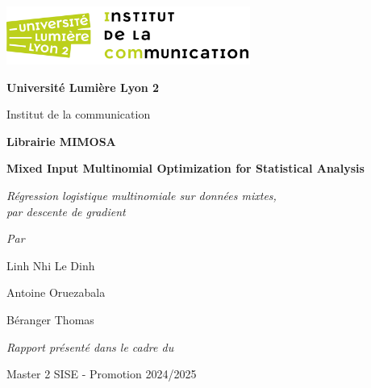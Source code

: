 \documentclass[10pt,french]{report}
\begin{document}
	\begin{titlepage}
		\centering
		\includegraphics[width=0.6\textwidth]{icom.png}\par\vspace{1cm}
		{\Large\bfseries Université Lumière Lyon 2}\par
		{\large Institut de la communication}\par\vspace{3cm}

		

		{\Huge\bfseries Librairie MIMOSA}\par\vspace{1cm}
		{\huge\bfseries Mixed Input Multinomial Optimization for Statistical Analysis}\par\vspace{1cm}
		
		{\Large\itshape Régression logistique multinomiale sur données mixtes,\\par descente de gradient}\par\vspace{2.5cm}

		{\Large\itshape Par}\par
		{\Large Linh Nhi Le Dinh}\par
		{\Large Antoine Oruezabala}\par
		{\Large Béranger Thomas}\par\vspace{1cm}

		{\large\itshape Rapport présenté dans le cadre du}\par
		{\large Master 2 SISE - Promotion 2024/2025}\par\vspace{1cm}


		\vfill

	\end{titlepage}

	\tableofcontents

	\setlength{\parskip}{12pt}
	
	\begin{abstract}
		Ce rapport détaille l'implémentation de la régression logistique multinomiale pour des données mixtes, en langage R, et en utilisant la descente de gradient. Nous couvrons tout d'abord quelques fondements théoriques, l'approche pratique et discutons des résultats obtenus. En fin d'ouvrage, un lexique donne des définitions des termes et expressions souvent usité en régression logistique.
		
		Il a été rédigé en novembre 2024 dans le cadre d'un projet du master 2 SISE.
	\end{abstract}
	
\end{document}
